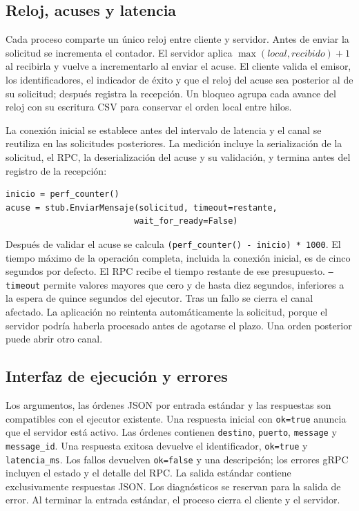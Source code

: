 \documentclass[11pt,a4paper]{article}
\begin{document}
\subsection{Reloj, acuses y latencia}

Cada proceso comparte un único reloj entre cliente y servidor.
Antes de enviar la solicitud se incrementa el contador. El servidor
aplica \(\max(local, recibido)+1\) al recibirla y vuelve a incrementarlo
al enviar el acuse. El cliente valida el emisor, los identificadores,
el indicador de éxito y que el reloj del acuse sea posterior al de su
solicitud; después registra la recepción. Un bloqueo agrupa cada avance
del reloj con su escritura CSV para conservar el orden local entre hilos.

La conexión inicial se establece antes del intervalo de latencia y el
canal se reutiliza en las solicitudes posteriores. La medición incluye
la serialización de la solicitud, el RPC, la deserialización del acuse
y su validación, y termina antes del registro de la recepción:

\begin{verbatim}
inicio = perf_counter()
acuse = stub.EnviarMensaje(solicitud, timeout=restante,
                          wait_for_ready=False)
\end{verbatim}

Después de validar el acuse se calcula
\texttt{(perf\_counter() - inicio) * 1000}. El tiempo máximo de la
operación completa, incluida la conexión inicial, es de cinco segundos
por defecto. El RPC recibe el tiempo restante de ese presupuesto.
\texttt{--timeout} permite valores mayores que cero y de hasta diez
segundos, inferiores a la espera de quince segundos del ejecutor.
Tras un fallo se cierra el canal afectado. La aplicación no reintenta
automáticamente la solicitud, porque el servidor podría haberla procesado
antes de agotarse el plazo. Una orden posterior puede abrir otro canal.

\subsection{Interfaz de ejecución y errores}

Los argumentos, las órdenes JSON por entrada estándar y las respuestas
son compatibles con el ejecutor existente. Una respuesta inicial con
\texttt{ok=true} anuncia que el servidor está activo. Las órdenes contienen
\texttt{destino}, \texttt{puerto}, \texttt{message} y \texttt{message\_id}.
Una respuesta exitosa devuelve el identificador, \texttt{ok=true} y
\texttt{latencia\_ms}. Los fallos devuelven \texttt{ok=false} y una
descripción; los errores gRPC incluyen el estado y el detalle del RPC.
La salida estándar contiene exclusivamente respuestas JSON. Los
diagnósticos se reservan para la salida de error. Al terminar la entrada
estándar, el proceso cierra el cliente y el servidor.
\end{document}
